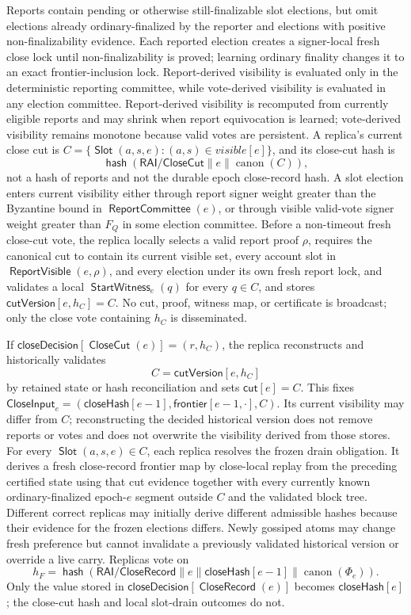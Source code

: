 \documentclass[sigplan,twocolumn,review,anonymous]{acmart}
\newcommand{\func}[1]{\operatorname{\mathsf{#1}}}
\newcommand{\hash}{\func{hash}}
\newcommand{\Slot}{\func{Slot}}
\newcommand{\ReportCommittee}{\func{ReportCommittee}}
\newcommand{\CloseCut}{\func{CloseCut}}
\newcommand{\CloseRecord}{\func{CloseRecord}}
\newcommand{\closeDecision}{\mathsf{closeDecision}}
\newcommand{\frontier}{\mathsf{frontier}}
\newcommand{\closeHash}{\mathsf{closeHash}}
\newcommand{\closeCut}{\mathsf{cut}}
\newcommand{\ReportVisible}{\func{ReportVisible}}
\newcommand{\cutVersion}{\mathsf{cutVersion}}
\begin{document}
Reports contain pending or otherwise still-finalizable slot elections, but omit elections already
ordinary-finalized by the reporter and elections with positive non-finalizability evidence.  Each
reported election creates a signer-local fresh close lock until non-finalizability is proved; learning
ordinary finality changes it to an exact frontier-inclusion lock.  Report-derived visibility is evaluated
only in the deterministic reporting committee, while
vote-derived visibility is evaluated in any election committee.  Report-derived visibility is recomputed
from currently eligible reports and may shrink when report equivocation is learned; vote-derived visibility
remains monotone because valid votes are persistent.  A replica's current close cut is
\(C=\{\Slot(a,s,e):(a,s)\in visible[e]\}\), and its close-cut hash is
\[
\hash(\mathsf{RAI/CloseCut}\parallel e\parallel\operatorname{canon}(C)),
\]
not a hash of reports and not the durable epoch close-record hash.  A slot election enters current visibility either through report signer weight greater than the Byzantine bound in \(\ReportCommittee(e)\), or through visible valid-vote signer weight greater than \(F_Q\) in some election committee.  Before a non-timeout fresh close-cut vote, the replica locally selects a valid report proof \(\rho\),
requires the canonical cut to contain its current visible set, every account slot in
\(\ReportVisible(e,\rho)\), and every election under its own fresh report lock, and validates a local
\(\func{StartWitness}_e(q)\) for every
\(q\in C\), and stores \(\cutVersion[e,h_C]=C\).  No cut, proof, witness map, or certificate is
broadcast; only the close vote containing \(h_C\) is disseminated.

If \(\closeDecision[\CloseCut(e)]=(r,h_C)\), the replica reconstructs and historically validates
\[
C=\cutVersion[e,h_C]
\]
by retained state or hash reconciliation and sets \(\closeCut[e]=C\).  This fixes
\(\mathsf{CloseInput}_e=(\closeHash[e-1],\frontier[e-1,\cdot],C)\).  Its current visibility may differ
from \(C\); reconstructing the decided historical version does not remove reports or votes and does not
overwrite the visibility derived from those stores.  For every \(\Slot(a,s,e)\in C\), each replica resolves the frozen drain obligation.  It derives a fresh
close-record frontier map by close-local replay from the preceding certified state using that cut
evidence together with every currently known ordinary-finalized epoch-\(e\) segment outside \(C\) and
the validated block tree.
Different correct replicas may initially derive different admissible hashes because their evidence for
the frozen elections differs.  Newly gossiped atoms may change fresh preference but cannot invalidate a
previously validated historical version or override a live carry.  Replicas vote on
\[
h_F=\hash(\mathsf{RAI/CloseRecord}\parallel e\parallel\closeHash[e-1]
\parallel\operatorname{canon}(\Phi_e)).
\]
Only the value stored in \(\closeDecision[\CloseRecord(e)]\) becomes \(\closeHash[e]\); the close-cut
hash and local slot-drain outcomes do not.
\end{document}
